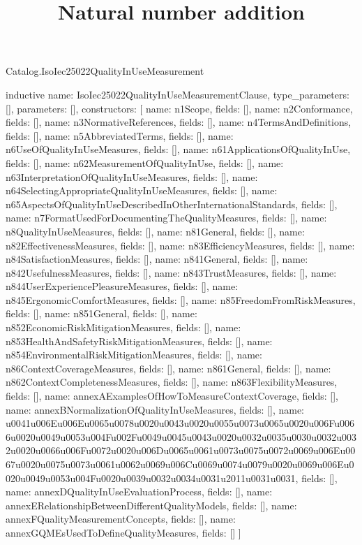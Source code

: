 \begin{lexlean}{Catalog.IsoIec25022QualityInUseMeasurement}
\title{Natural number addition}
\begin{semanticmodule}
inductive{
  name: IsoIec25022QualityInUseMeasurementClause,
  type_parameters: [],
  parameters: [],
  constructors: [
    {name: n1Scope, fields: []},
    {name: n2Conformance, fields: []},
    {name: n3NormativeReferences, fields: []},
    {name: n4TermsAndDefinitions, fields: []},
    {name: n5AbbreviatedTerms, fields: []},
    {name: n6UseOfQualityInUseMeasures, fields: []},
    {name: n61ApplicationsOfQualityInUse, fields: []},
    {name: n62MeasurementOfQualityInUse, fields: []},
    {name: n63InterpretationOfQualityInUseMeasures, fields: []},
    {name: n64SelectingAppropriateQualityInUseMeasures, fields: []},
    {name: n65AspectsOfQualityInUseDescribedInOtherInternationalStandards, fields: []},
    {name: n7FormatUsedForDocumentingTheQualityMeasures, fields: []},
    {name: n8QualityInUseMeasures, fields: []},
    {name: n81General, fields: []},
    {name: n82EffectivenessMeasures, fields: []},
    {name: n83EfficiencyMeasures, fields: []},
    {name: n84SatisfactionMeasures, fields: []},
    {name: n841General, fields: []},
    {name: n842UsefulnessMeasures, fields: []},
    {name: n843TrustMeasures, fields: []},
    {name: n844UserExperiencePleasureMeasures, fields: []},
    {name: n845ErgonomicComfortMeasures, fields: []},
    {name: n85FreedomFromRiskMeasures, fields: []},
    {name: n851General, fields: []},
    {name: n852EconomicRiskMitigationMeasures, fields: []},
    {name: n853HealthAndSafetyRiskMitigationMeasures, fields: []},
    {name: n854EnvironmentalRiskMitigationMeasures, fields: []},
    {name: n86ContextCoverageMeasures, fields: []},
    {name: n861General, fields: []},
    {name: n862ContextCompletenessMeasures, fields: []},
    {name: n863FlexibilityMeasures, fields: []},
    {name: annexAExamplesOfHowToMeasureContextCoverage, fields: []},
    {name: annexBNormalizationOfQualityInUseMeasures, fields: []},
    {name: u0041u006Eu006Eu0065u0078u0020u0043u0020u0055u0073u0065u0020u006Fu0066u0020u0049u0053u004Fu002Fu0049u0045u0043u0020u0032u0035u0030u0032u0032u0020u0066u006Fu0072u0020u006Du0065u0061u0073u0075u0072u0069u006Eu0067u0020u0075u0073u0061u0062u0069u006Cu0069u0074u0079u0020u0069u006Eu0020u0049u0053u004Fu0020u0039u0032u0034u0031u2011u0031u0031, fields: []},
    {name: annexDQualityInUseEvaluationProcess, fields: []},
    {name: annexERelationshipBetweenDifferentQualityModels, fields: []},
    {name: annexFQualityMeasurementConcepts, fields: []},
    {name: annexGQMEsUsedToDefineQualityMeasures, fields: []}
  ]
}


\end{semanticmodule}
\end{lexlean}
